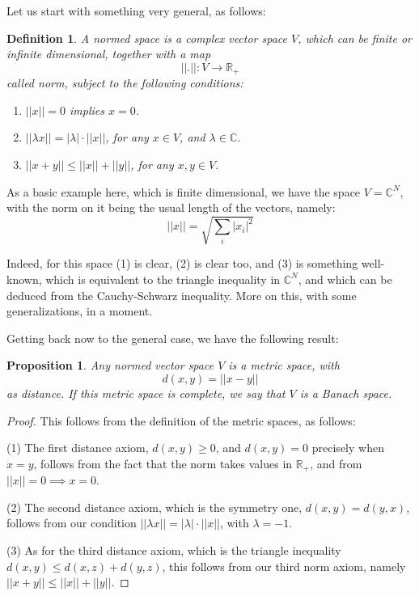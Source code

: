 \documentclass[12pt]{amsbook}
\newtheorem{definition}[theorem]{Definition}
\newtheorem{proposition}[theorem]{Proposition}
\begin{document}
\bigskip

Let us start with something very general, as follows:

\begin{definition}
A normed space is a complex vector space $V$, which can be finite or infinite dimensional, together with a map
$$||.||:V\to\mathbb R_+$$
called norm, subject to the following conditions:
\begin{enumerate}
\item $||x||=0$ implies $x=0$.

\item $||\lambda x||=|\lambda|\cdot||x||$, for any $x\in V$, and $\lambda\in\mathbb C$.

\item $||x+y||\leq||x||+||y||$, for any $x,y\in V$.
\end{enumerate} 
\end{definition}

As a basic example here, which is finite dimensional, we have the space $V=\mathbb C^N$, with the norm on it being the usual length of the vectors, namely:
$$||x||=\sqrt{\sum_i|x_i|^2}$$

Indeed, for this space (1) is clear, (2) is clear too, and (3) is something well-known, which is equivalent to the triangle inequality in $\mathbb C^N$, and which can be deduced from the Cauchy-Schwarz inequality. More on this, with some generalizations, in a moment.

\bigskip

Getting back now to the general case, we have the following result:

\begin{proposition}
Any normed vector space $V$ is a metric space, with
$$d(x,y)=||x-y||$$
as distance. If this metric space is complete, we say that $V$ is a Banach space.
\end{proposition}

\begin{proof}
This follows from the definition of the metric spaces, as follows:

\medskip

(1) The first distance axiom, $d(x,y)\geq0$, and $d(x,y)=0$ precisely when $x=y$, follows from the fact that the norm takes values in $\mathbb R_+$, and from $||x||=0\implies x=0$.

\medskip

(2) The second distance axiom, which is the symmetry one, $d(x,y)=d(y,x)$, follows from our condition $||\lambda x||=|\lambda|\cdot||x||$, with $\lambda=-1$.

\medskip

(3) As for the third distance axiom, which is the triangle inequality $d(x,y)\leq d(x,z)+d(y,z)$, this follows from our third norm axiom, namely $||x+y||\leq||x||+||y||$.
\end{proof}
\end{document}

